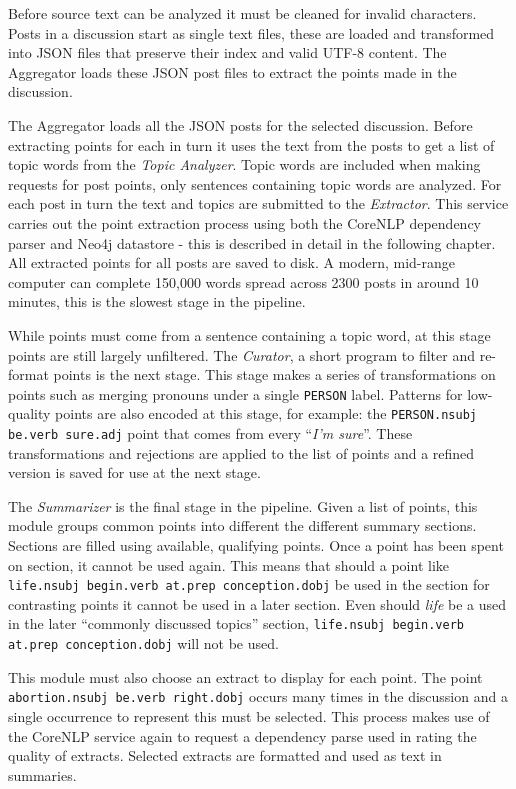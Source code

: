   Before source text can be analyzed it must be cleaned for invalid characters. Posts in a discussion start as single text files, these are loaded and transformed into JSON files that preserve their index and valid UTF-8 content. The Aggregator loads these JSON post files to extract the points made in the discussion.

  The Aggregator loads all the JSON posts for the selected discussion. Before extracting points for each in turn it uses the text from the posts to get a list of topic words from the \textit{Topic Analyzer}. Topic words are included when making requests for post points, only sentences containing topic words are analyzed. For each post in turn the text and topics are submitted to the \textit{Extractor}. This service carries out the point extraction process using both the CoreNLP dependency parser and Neo4j datastore - this is described in detail in the following chapter. All extracted points for all posts are saved to disk. A modern, mid-range computer can complete 150,000 words spread across 2300 posts in around 10 minutes, this is the slowest stage in the pipeline.

  While points must come from a sentence containing a topic word, at this stage points are still largely unfiltered. The \textit{Curator}, a short program to filter and re-format points is the next stage. This stage makes a series of transformations on points such as merging pronouns under a single \texttt{PERSON} label. Patterns for low-quality points are also encoded at this stage, for example: the \texttt{PERSON.nsubj be.verb sure.adj} point that comes from every ``\textit{I'm sure}''. These transformations and rejections are applied to the list of points and a refined version is saved for use at the next stage.

  The \textit{Summarizer} is the final stage in the pipeline. Given a list of points, this module groups common points into different the different summary sections. Sections are filled using available, qualifying points. Once a point has been spent on section, it cannot be used again. This means that should a point like \texttt{life.nsubj begin.verb at.prep conception.dobj} be used in the section for contrasting points it cannot be used in a later section. Even should \textit{life} be a used in the later ``commonly discussed topics'' section, \texttt{life.nsubj begin.verb at.prep conception.dobj} will not be used.

  This module must also choose an extract to display for each point. The point \texttt{abortion.nsubj be.verb right.dobj} occurs many times in the discussion and a single occurrence to represent this must be selected. This process makes use of the CoreNLP service again to request a dependency parse used in rating the quality of extracts. Selected extracts are formatted and used as text in summaries.

